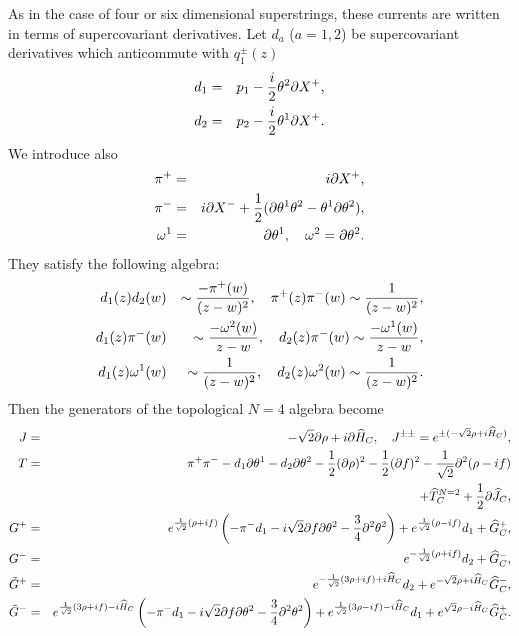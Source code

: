 \documentclass[a4paper,12pt]{article}
\begin{document}
As in the case of four or six dimensional superstrings\cite{Be}, 
these currents
are written in terms of supercovariant derivatives.
Let $d_{a}$ ($a=1,2$) be supercovariant derivatives which anticommute
with $q^{\pm}_{1}(z)$
\begin{eqnarray}
 d_{1}&=& p_{1}-{i\over2}\theta^{2}\partial X^{+},\nonumber\\
 d_{2}&=& p_{2}-{i\over2}\theta^{1}\partial X^{+}.
\end{eqnarray}
We introduce also
\begin{eqnarray}
\pi^{+}&=&i\partial X^{+},\nonumber\\
 \pi^{-}&=& i\partial X^{-}+
{1\over2}(\partial \theta^{1} \theta^{2}-\theta^{1}\partial
\theta^{2}),\nonumber\\
\omega^{1}&=&\partial\theta^{1},\quad
\omega^{2}=\partial \theta^{2}.
\end{eqnarray}
They satisfy the following algebra:
\begin{eqnarray}
d_{1}(z)d_{2}(w)&&\sim {-\pi^{+}(w)\over (z-w)^2},\quad
\pi^{+}(z)\pi^{-}(w)\sim{1\over (z-w)^2},\nonumber\\
d_{1}(z)\pi^{-}(w)&&\sim {-\omega^{2}(w)\over z-w},\quad
d_{2}(z)\pi^{-}(w)\sim{-\omega^{1}(w)\over z-w},\nonumber\\
d_{1}(z)\omega^{1}(w)&&\sim {1\over (z-w)^2},\quad
d_{2}(z)\omega^{2}(w)\sim{1\over (z-w)^2}.
\end{eqnarray}
Then the generators of the  topological $N=4$ algebra become
\begin{eqnarray}
J&=&-\sqrt{2}\partial\rho+i\partial\widehat{H}_{C}, \quad
J^{\pm\pm}=e^{\pm (-\sqrt{2}\rho+i\widehat{H}_{C})},\nonumber\\
T&=& \pi^{+}\pi^{-}-d_{1}\partial\theta^{1}
-d_{2}\partial\theta^{2}
-{1\over2}(\partial\rho)^{2}
-{1\over2}(\partial f)^{2}
-{1\over\sqrt{2}}\partial^{2}(\rho-i f)\nonumber\\
&&
+\widehat{T}^{N=2}_{C}+{1\over2}\partial \widehat{J}_{C},
\nonumber\\
G^{+}&=&
e^{{1\over\sqrt{2}}(\rho+i f)} 
\left(-\pi^{-}d_{1}
-i\sqrt{2}\partial f \partial \theta^{2}
-{3\over4}\partial^2\theta^2
\right)
+e^{{1\over\sqrt{2}}(\rho-i f)}d_{1}
+\widehat{G}^{+}_{C}
, \nonumber\\
G^{-}&=& e^{-{1\over\sqrt{2}}(\rho+if)}d_{2}+\widehat{G}^{-}_{C},
\nonumber\\
 \tilde{G}^{+}&=&
e^{-{1\over\sqrt{2}}(3\rho+i f)+i\widehat{H}_{C}}
d_{2}
+e^{-\sqrt{2}\rho+i\widehat{H}_{C}}\widehat{G}^{-}_{C},\nonumber\\
\tilde{G}^{-}&=&
e^{{1\over\sqrt{2}}(3\rho+i f)-i\widehat{H}_{C}} 
\left(-\pi^{-}d_{1}
-i\sqrt{2}\partial f \partial \theta^{2}
-{3\over4}\partial^2\theta^2
\right)
+e^{{1\over\sqrt{2}}(3\rho-i f)-i\widehat{H}_{C}}d_{1}
+e^{\sqrt{2}\rho-i\widehat{H}_{C}}\widehat{G}^{+}_{C}. \nonumber\\
\label{eq:top3}
\end{eqnarray}
\end{document}
